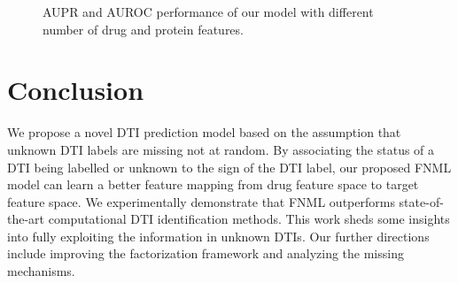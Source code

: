 \documentclass[sigconf,anonymous]{acmart}
\begin{document}
\begin{figure}[!ht]
\centering
{}
\vspace*{-10pt}
\caption{AUPR and AUROC performance of our model with different number of drug and protein features.}\label{fig:parameter}
\end{figure}



\section{Conclusion}\label{sec:conclusion}

We propose a novel DTI prediction model based on the assumption that unknown DTI labels are missing not at random. By associating the status of a DTI being labelled or unknown to the sign of the DTI label, our proposed FNML model can learn a better feature mapping from drug feature space to target feature space. We experimentally demonstrate that FNML outperforms state-of-the-art computational DTI identification methods. This work sheds some insights into fully exploiting the information in unknown DTIs. Our further directions include improving the factorization framework and analyzing the missing mechanisms. 
\end{document}
